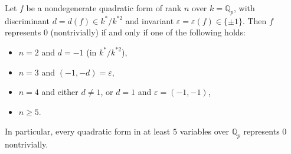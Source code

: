 Let $f$ be a nondegenerate quadratic form of rank $n$ over $k = \mathbb{Q}_p$, with discriminant $d = d(f) \in k^*/k^{*2}$ and invariant $\varepsilon = \varepsilon(f) \in \{\pm 1\}$. Then $f$ represents $0$ (nontrivially) if and only if one of the following holds:

\begin{itemize}
\item[(i)] $n = 2$ and $d = -1$ (in $k^*/k^{*2}$),
\item[(ii)] $n = 3$ and $(-1, -d) = \varepsilon$,
\item[(iii)] $n = 4$ and either $d \neq 1$, or $d = 1$ and $\varepsilon = (-1, -1)$,
\item[(iv)] $n \geq 5$.
\end{itemize}

In particular, every quadratic form in at least $5$ variables over $\mathbb{Q}_p$ represents $0$ nontrivially.
